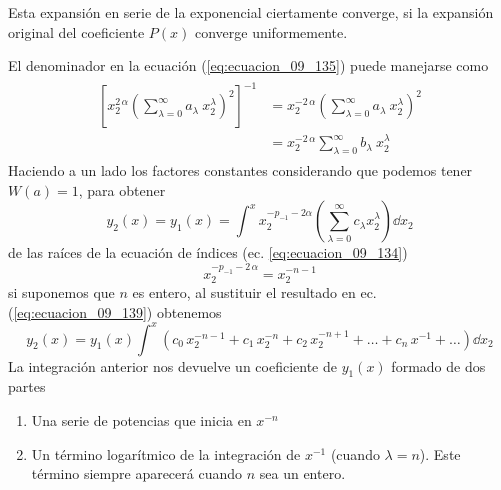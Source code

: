 Esta expansión en serie de la exponencial ciertamente converge, si la expansión original del coeficiente $P(x)$ converge uniformemente.
\par
El denominador en la ecuación (\ref{eq:ecuacion_09_135}) puede manejarse como
\begin{align}
\begin{aligned}
\left[ x_{2}^{2 \, \alpha} \left( \sum_{\lambda=0}^{\infty} a_{\lambda} \: x_{2}^{\lambda} \right)^{2} \right]^{-1} &= x_{2}^{-2 \, \alpha} \left( \sum_{\lambda=0}^{\infty} a_{\lambda} \: x_{2}^{\lambda} \right)^{2}  \\
&= x_{2}^{-2 \, \alpha} \sum_{\lambda=0}^{\infty} b_{\lambda} \: x_{2}^{\lambda}
\end{aligned}
\label{eq:ecuacion_09_138}
\end{align}
Haciendo a un lado los factores constantes considerando que podemos tener $W(a) = 1$, para obtener
\begin{equation}
y_{2}(x) =  y_{1}(x) = \int^{x} x_{2}^{-p_{-1}-2 \alpha} \left( \sum_{\lambda=0}^{\infty} c_{\lambda} x_{2}^{\lambda} \right) \dd{x_{2}} 
\label{eq:ecuacion_09_139}
\end{equation}
de las raíces de la ecuación de índices (ec. \ref{eq:ecuacion_09_134})
\begin{equation}
x_{2}^{-p_{-1} - 2 \, \alpha} = x_{2}^{-n-1}
\end{equation}
si suponemos que $n$ es entero, al sustituir el resultado en ec. (\ref{eq:ecuacion_09_139}) obtenemos 
\begin{equation}
y_{2}(x) = y_{1}(x) \int^{x} (c_{0} \, x_{2}^{-n-1} + c_{1} \, x_{2}^{-n} + c_{2} \, x_{2}^{-n+1} + \ldots + c_{n} \, x^{-1} + \ldots ) \dd{x_{2}}
\label{eq:ecuacion_09_141}
\end{equation}
La integración anterior nos devuelve un coeficiente de $y_{1}(x)$ formado de dos partes
\begin{enumerate}
\item Una serie de potencias que inicia en $x^{-n}$
\item Un término logarítmico de la integración de $x^{-1}$ (cuando $\lambda=n$). Este término siempre aparecerá cuando $n$ sea un entero.
\end{enumerate}